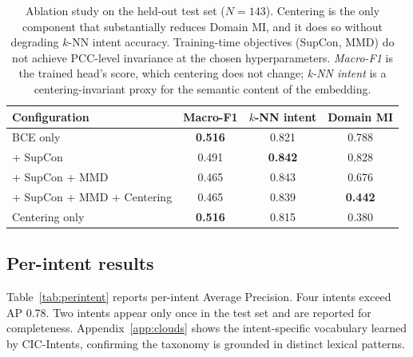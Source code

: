 \documentclass[preprint,12pt,authoryear]{elsarticle}
\begin{document}
\begin{table}[t]
\centering
\caption{Ablation study on the held-out test set ($N=143$).
Centering is the only component that substantially reduces Domain
MI, and it does so without degrading $k$-NN intent accuracy.
Training-time objectives (SupCon, MMD) do not achieve PCC-level
invariance at the chosen hyperparameters. \emph{Macro-F1} is the
trained head's score, which centering does not change;
\emph{k-NN intent} is a centering-invariant proxy for the semantic
content of the embedding.}
\label{tab:ablation}
\begin{tabular}{lccc}
\toprule
\textbf{Configuration} & \textbf{Macro-F1} & \textbf{$k$-NN intent} & \textbf{Domain MI} \\
\midrule
BCE only                     & \textbf{0.516} & 0.821 & 0.788 \\
+ SupCon                      & 0.491 & \textbf{0.842} & 0.828 \\
+ SupCon + MMD                & 0.465 & 0.843 & 0.676 \\
+ SupCon + MMD + Centering    & 0.465 & 0.839 & \textbf{0.442} \\
Centering only                & \textbf{0.516} & 0.815 & 0.380 \\
\bottomrule
\end{tabular}
\end{table}

\subsection{Per-intent results}

Table~\ref{tab:perintent} reports per-intent Average Precision. Four
intents exceed AP 0.78. Two intents appear only once in the test set
and are reported for completeness. Appendix~\ref{app:clouds} shows
the intent-specific vocabulary learned by CIC-Intents, confirming
the taxonomy is grounded in distinct lexical patterns.
\end{document}
